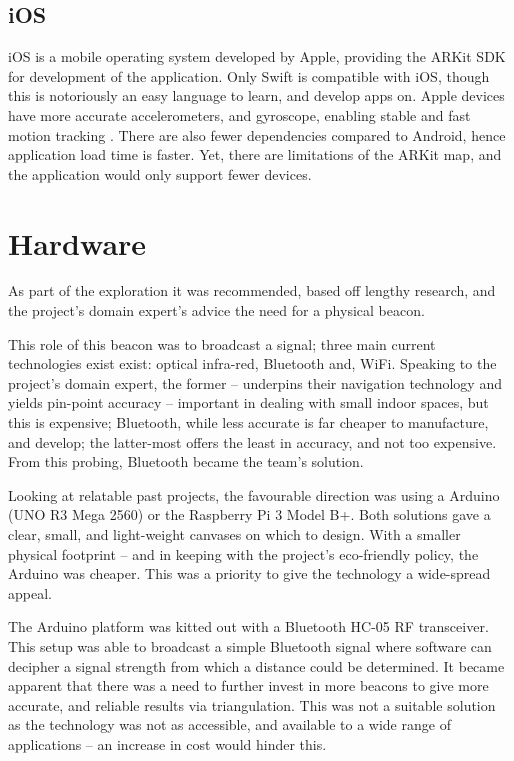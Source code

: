 \subsection{iOS}
iOS is a mobile operating system developed by Apple, providing the ARKit SDK for development of the application. Only Swift is compatible with iOS, though this is notoriously an easy language to learn, and develop apps on. Apple devices have more accurate accelerometers, and gyroscope, enabling stable and fast motion tracking \cite{pmc}. There are also fewer dependencies compared to Android, hence application load time is faster. Yet, there are limitations of the ARKit map, and the application would only support fewer devices.

\section{Hardware}
As part of the exploration it was recommended, based off lengthy research, and the project’s domain expert's advice the need for a physical beacon. 

This role of this beacon was to broadcast a signal; three main current technologies exist exist: optical infra-red, Bluetooth and, WiFi. Speaking to the project's domain expert, the former –  underpins their navigation technology and yields pin-point accuracy – important in dealing with small indoor spaces, but this is expensive; Bluetooth, while less accurate is far cheaper to manufacture, and develop; the latter-most offers the least in accuracy, and not too expensive. From this probing, Bluetooth became the team’s solution.

Looking at relatable past projects, the favourable direction was using a Arduino (UNO R3 Mega 2560) or the Raspberry Pi 3 Model B+. Both solutions gave a clear, small, and light-weight canvases on which to design. With a smaller physical footprint – and in keeping with the project’s eco-friendly policy, the Arduino was cheaper. This was a priority to give the technology a wide-spread appeal.

The Arduino platform was kitted out with a Bluetooth HC-05 RF transceiver. This setup was able to broadcast a simple Bluetooth signal where software can decipher a signal strength from which a distance could be determined. It became apparent that there was a need to further invest in more beacons to give more accurate, and reliable results via triangulation. This was not a suitable solution as the technology was not as accessible, and available to a wide range of applications – an increase in cost would hinder this.